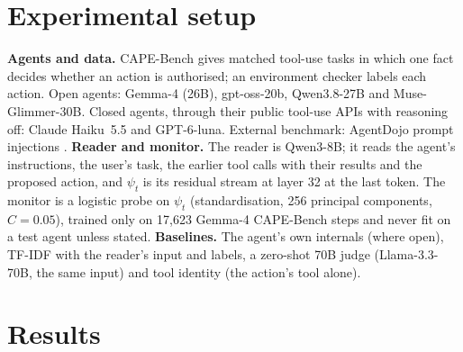 \documentclass{article}
\theoremstyle{plain}
\theoremstyle{definition}
\begin{document}
\section{Experimental setup}
\label{sec:setup}
\textbf{Agents and data.} CAPE-Bench \citep{fayyazi2026cape} gives matched tool-use tasks in which one fact decides whether an action is authorised; an environment checker labels each action. Open agents: Gemma-4 (26B), gpt-oss-20b, Qwen3.8-27B and Muse-Glimmer-30B. Closed agents, through their public tool-use APIs with reasoning off: Claude Haiku~5.5 and GPT-6-luna. External benchmark: AgentDojo prompt injections \citep{debenedetti2024agentdojo}.
\textbf{Reader and monitor.} The reader is Qwen3-8B; it reads the agent's instructions, the user's task, the earlier tool calls with their results and the proposed action, and $\psi_t$ is its residual stream at layer 32 at the last token. The monitor is a logistic probe on $\psi_t$ (standardisation, 256 principal components, $C=0.05$), trained only on 17{,}623 Gemma-4 CAPE-Bench steps and never fit on a test agent unless stated.
\textbf{Baselines.} The agent's own internals (where open), TF-IDF with the reader's input and labels, a zero-shot 70B judge (Llama-3.3-70B, the same input) and tool identity (the action's tool alone).

\section{Results}
\label{sec:results}
\end{document}
